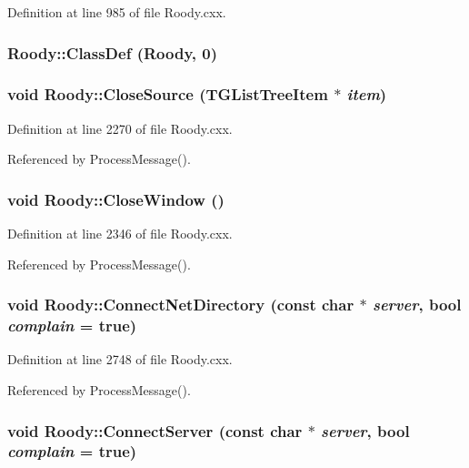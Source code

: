 Definition at line 985 of file Roody.cxx.
\subsubsection[{ClassDef}]{\setlength{\rightskip}{0pt plus 5cm}Roody::ClassDef ({\bf Roody}, \/  0)}\label{classRoody_ab4828045f8dd6c6585aee8e90ad0361e}
\subsubsection[{CloseSource}]{\setlength{\rightskip}{0pt plus 5cm}void Roody::CloseSource (TGListTreeItem $\ast$ {\em item})\hspace{0.3cm}{\ttfamily  [private]}}\label{classRoody_ab239d4f1ca9f8bd28e8ddb0fcf6924c2}


Definition at line 2270 of file Roody.cxx.

Referenced by ProcessMessage().
\subsubsection[{CloseWindow}]{\setlength{\rightskip}{0pt plus 5cm}void Roody::CloseWindow ()}\label{classRoody_ab51ab27b19c5e26e06197f55f8315459}


Definition at line 2346 of file Roody.cxx.

Referenced by ProcessMessage().
\subsubsection[{ConnectNetDirectory}]{\setlength{\rightskip}{0pt plus 5cm}void Roody::ConnectNetDirectory (const char $\ast$ {\em server}, \/  bool {\em complain} = {\ttfamily true})}\label{classRoody_ae82d729c15fbfb89641e812fcc27d35f}


Definition at line 2748 of file Roody.cxx.

Referenced by ProcessMessage().
\subsubsection[{ConnectServer}]{\setlength{\rightskip}{0pt plus 5cm}void Roody::ConnectServer (const char $\ast$ {\em server}, \/  bool {\em complain} = {\ttfamily true})}\label{classRoody_a535ef1e18afb6684d16ff1e216b2e981}


